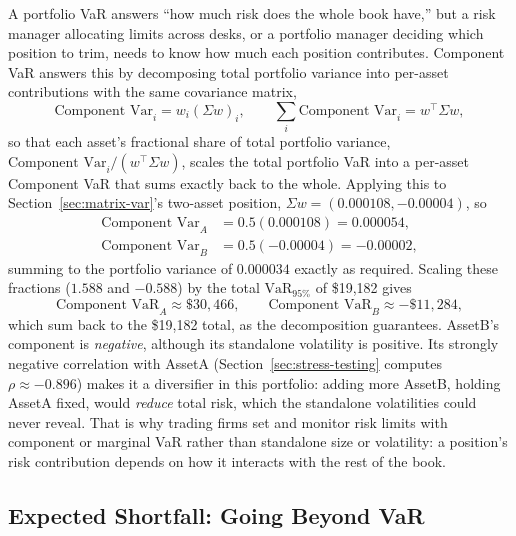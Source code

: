\documentclass[../ai_in_finance]{subfiles}
\begin{document}
A portfolio VaR answers ``how much risk does the whole book have,'' but a risk manager allocating limits across desks, or a portfolio manager deciding which position to trim, needs to know how much each position contributes. Component VaR answers this by decomposing total portfolio variance into per-asset contributions with the same covariance matrix,
\begin{equation}
\label{eq:marketrisk-component-var}
\text{Component Var}_i = w_i (\Sigma w)_i, \qquad \sum_i \text{Component Var}_i = w^\top \Sigma w,
\end{equation}
so that each asset's fractional share of total portfolio variance, $\text{Component Var}_i / (w^\top\Sigma w)$, scales the total portfolio VaR into a per-asset Component VaR that sums exactly back to the whole. Applying this to Section~\ref{sec:matrix-var}'s two-asset position, $\Sigma w = (0.000108, -0.00004)$, so
\begin{align*}
\text{Component Var}_A &= 0.5(0.000108) = 0.000054, \\
\text{Component Var}_B &= 0.5(-0.00004) = -0.00002,
\end{align*}
summing to the portfolio variance of $0.000034$ exactly as required. Scaling these fractions ($1.588$ and $-0.588$) by the total $\text{VaR}_{95\%}$ of \$19,182 gives
\begin{equation*}
\text{Component VaR}_A \approx \$30{,}466, \qquad \text{Component VaR}_B \approx -\$11{,}284,
\end{equation*}
which sum back to the \$19,182 total, as the decomposition guarantees. AssetB's component is \emph{negative}, although its standalone volatility is positive. Its strongly negative correlation with AssetA (Section~\ref{sec:stress-testing} computes $\rho\approx-0.896$) makes it a diversifier in this portfolio: adding more AssetB, holding AssetA fixed, would \emph{reduce} total risk, which the standalone volatilities could never reveal.
That is why trading firms set and monitor risk limits with component or marginal VaR rather than standalone size or volatility: a position's risk contribution depends on how it interacts with the rest of the book.

\subsection{Expected Shortfall: Going Beyond VaR}
\end{document}
